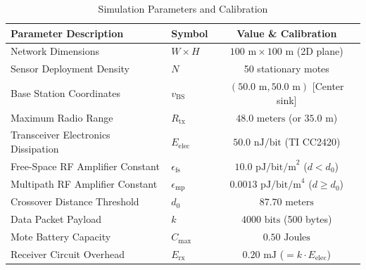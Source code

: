 \documentclass[conference]{IEEEtran}
\begin{document}
\begin{table}[!t]
\caption{Simulation Parameters and Calibration}
\label{tab:param}
\centering
\begin{tabular}{@{}llc@{}}
\toprule
\textbf{Parameter Description} & \textbf{Symbol} & \textbf{Value \& Calibration} \\
\midrule
Network Dimensions & $W \times H$ & $100\text{ m} \times 100\text{ m}$ (2D plane) \\
Sensor Deployment Density & $N$ & 50 stationary motes \\
Base Station Coordinates & $v_{\text{BS}}$ & $(50.0\text{ m}, 50.0\text{ m})$ [Center sink] \\
Maximum Radio Range & $R_{\text{tx}}$ & $48.0\text{ meters}$ (or $35.0\text{ m}$) \\
Transceiver Electronics Dissipation & $E_{\text{elec}}$ & $50.0\text{ nJ/bit}$ (TI CC2420) \\
Free-Space RF Amplifier Constant & $\epsilon_{\text{fs}}$ & $10.0\text{ pJ/bit/m}^2$ ($d < d_0$) \\
Multipath RF Amplifier Constant & $\epsilon_{\text{mp}}$ & $0.0013\text{ pJ/bit/m}^4$ ($d \ge d_0$) \\
Crossover Distance Threshold & $d_0$ & $87.70\text{ meters}$ \\
Data Packet Payload & $k$ & $4000\text{ bits}$ (500 bytes) \\
Mote Battery Capacity & $C_{\text{max}}$ & $0.50\text{ Joules}$ \\
Receiver Circuit Overhead & $E_{\text{rx}}$ & $0.20\text{ mJ}$ ($= k \cdot E_{\text{elec}}$) \\
\bottomrule
\end{tabular}
\end{table}
\end{document}
